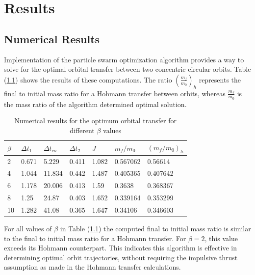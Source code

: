 \chapter{Results}


\section{Numerical Results}

\noindent Implementation of the particle swarm optimization algorithm provides a way to solve for the optimal 
orbital transfer between two concentric circular orbits. Table (\ref{tab:Numerical-Results}) shows
the results of these computations. The ratio $(\frac{m_f}{m_{0}})_h$ represents the final to initial mass
ratio for a Hohmann transfer between orbits, whereas $\frac{m_f}{m_0}$ is the mass ratio of the algorithm 
determined optimal solution.


\begin{table}[H]
  \centering
  \begin{tabular}{@{}lllllll@{}}
  \toprule
  $\beta$ & $\Delta t_1$ & $\Delta t_{co}$ & $\Delta t_2$ & $J$ & $m_f/m_0$ & $(m_f/m_0)_h$ \\ \midrule
  2 & 0.671 & 5.229 & 0.411 & 1.082 & 0.567062 & 0.56614 \\
  4 & 1.044 & 11.834 & 0.442 & 1.487 & 0.405365 & 0.407642 \\
  6 & 1.178 & 20.006 & 0.413 & 1.59 & 0.3638 & 0.368367 \\
  8 & 1.25 & 24.87 & 0.403 & 1.652 & 0.339164 & 0.353299 \\
  10 & 1.282 & 41.08 & 0.365 & 1.647 & 0.34106 & 0.346603 \\ \bottomrule
  \end{tabular}
  \caption{Numerical results for the optimum orbital transfer for different $\beta$ values }
  \label{tab:Numerical-Results}
  \end{table}

\noindent For all values of $\beta$ in Table (\ref{tab:Numerical-Results}) the computed final to initial mass ratio is similar to the final to 
initial mass ratio for a Hohmann transfer. For $\beta = 2$, this value exceeds its Hohmann
counterpart. This indicates this algorithm is effective in determining optimal orbit trajectories, without
requiring the impulsive thrust assumption as made in the Hohmann transfer calculations.

